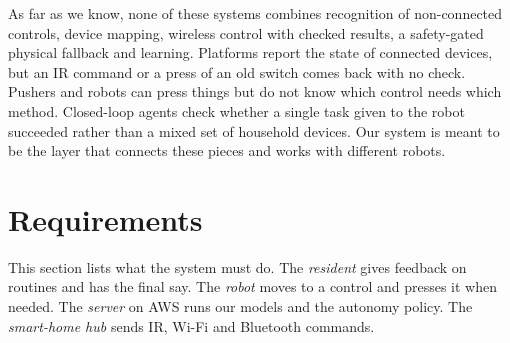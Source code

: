 \documentclass[conference]{IEEEtran}
\begin{document}
As far as we know, none of these systems combines recognition of non-connected controls, device mapping, wireless control with checked results, a safety-gated physical fallback and learning. Platforms report the state of connected devices, but an IR command or a press of an old switch comes back with no check. Pushers and robots can press things but do not know which control needs which method. Closed-loop agents check whether a single task given to the robot succeeded rather than a mixed set of household devices. Our system is meant to be the layer that connects these pieces and works with different robots.

\section{Requirements}\label{sec:req}
This section lists what the system must do. The \emph{resident} gives feedback on routines and has the final say. The \emph{robot} moves to a control and presses it when needed. The \emph{server} on AWS runs our models and the autonomy policy. The \emph{smart-home hub} sends IR, Wi-Fi and Bluetooth commands.
\end{document}
